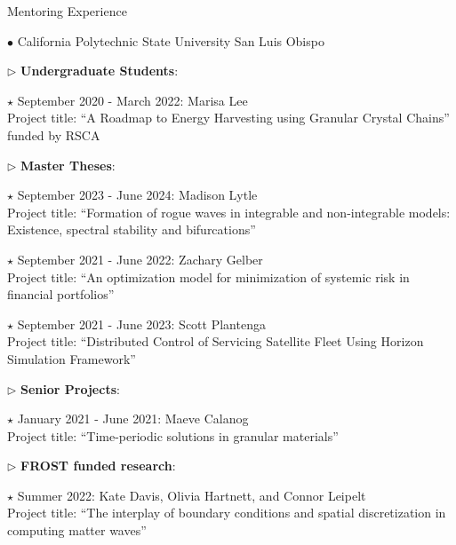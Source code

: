\documentclass[10pt]{article} %
\newenvironment{outerlist}[1][\enskip\textbullet]%
        {\begin{itemize}[#1]}{\end{itemize}%
         \vspace{-.6\baselineskip}}
\newenvironment{innerlist}[1][\enskip\textbullet]%
        {\begin{compactitem}[#1]}{\end{compactitem}}
\begin{document}
\begin{section}{Mentoring Experience}
\begin{outerlist}

\item[$\bullet$] \vskip -7mm California Polytechnic State University San Luis Obispo

\begin{innerlist}
\item[$\triangleright$] \textbf{Undergraduate Students}:
\begin{innerlist}
\item[$\star$] September 2020 - March 2022: Marisa Lee\\
Project title: ``A Roadmap to Energy Harvesting using Granular Crystal Chains'' funded by RSCA
\end{innerlist}
\item[$\triangleright$] \textbf{Master Theses}:
\begin{innerlist}
\item[$\star$] September 2023 - June 2024: Madison Lytle\\
Project title: ``Formation of rogue waves in integrable and non-integrable models: Existence, spectral
stability and bifurcations''
\item[$\star$] September 2021 - June 2022: Zachary Gelber\\
Project title: ``An optimization model for minimization of systemic risk in financial portfolios''
\item[$\star$] September 2021 - June 2023: Scott Plantenga\\
Project title: ``Distributed Control of Servicing Satellite Fleet Using Horizon Simulation Framework''
\end{innerlist}
\item[$\triangleright$] \textbf{Senior Projects}:
\begin{innerlist}
\item[$\star$] January 2021 - June 2021: Maeve Calanog\\
Project title: ``Time-periodic solutions in granular materials''
\end{innerlist}
\item[$\triangleright$] \textbf{FROST funded research}:
\begin{innerlist}
\item[$\star$] Summer 2022: Kate Davis, Olivia Hartnett, and Connor Leipelt\\
Project title: ``The interplay of boundary conditions and spatial discretization in computing matter waves''

\end{innerlist}
\end{innerlist}
\end{outerlist}
\end{section}
\end{document}
